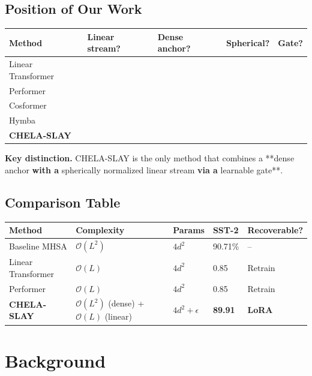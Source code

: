 \subsection{Position of Our Work}

\begin{table}[H]
\centering
\small
\begin{tabular}{lllll}
\toprule
\textbf{Method} & \textbf{Linear stream?} & \textbf{Dense anchor?} & \textbf{Spherical?} & \textbf{Gate?} \\
\midrule
Linear Transformer &  &  &  &  \\
Performer &  &  &  &  \\
Cosformer &  &  &  &  \\
Hymba &  &  &  &  \\
\textbf{CHELA-SLAY} &  &  &  &  \\
\bottomrule
\end{tabular}
\end{table}

\textbf{Key distinction.} CHELA-SLAY is the only method that combines a **dense 
anchor\textbf{ with a }spherically normalized linear stream\textbf{ via a }learnable 
gate**.



\subsection{Comparison Table}

\begin{table}[H]
\centering
\small
\begin{tabular}{lllll}
\toprule
\textbf{Method} & \textbf{Complexity} & \textbf{Params} & \textbf{SST-2} & \textbf{Recoverable?} \\
\midrule
Baseline MHSA & $\mathcal{O}(L^2)$ & $4d^2$ & 90.71\% & -- \\
Linear Transformer & $\mathcal{O}(L)$ & $4d^2$ & 0.85 & Retrain \\
Performer & $\mathcal{O}(L)$ & $4d^2$ & 0.85 & Retrain \\
\textbf{CHELA-SLAY} & $\mathcal{O}(L^2)$ (dense) + $\mathcal{O}(L)$ (linear) & $4d^2 + \epsilon$ & \textbf{89.91} & \textbf{LoRA} \\
\bottomrule
\end{tabular}
\end{table}



\section{Background}

